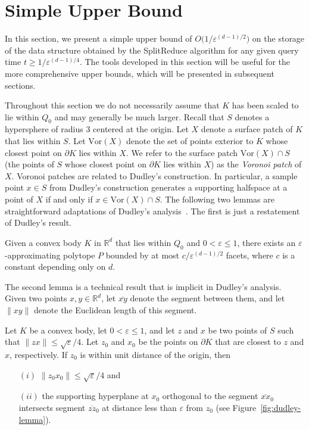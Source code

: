 \documentclass[11pt]{article}   \usepackage[letterpaper,hmargin=2.1cm,vmargin=3cm]{geometry}
\newcommand{\RE}{\mathbb{R}}    \newcommand{\ZZ}{\mathbb{Z}}    \newcommand{\eps}{\varepsilon}  \newcommand{\ST}{\,:\,}         \newcommand{\sq}{\square}
\newcommand{\alg}{\textrm{SplitReduce}}
\newcommand{\Vor}{\mathrm{Vor}}
\begin{document}
\section{Simple Upper Bound} \label{sec:firstbound}


In this section, we present a simple upper bound of $O\big(1/\eps^{(d-1)/2}\big)$ on the storage of the data structure obtained by the {\alg} algorithm for any given query time $t \geq 1/\eps^{(d-1)/4}$. The tools developed in this section will be useful for the more comprehensive upper bounds, which will be presented in subsequent sections.

Throughout this section we do not necessarily assume that $K$ has been scaled to lie within $Q_0$ and may generally be much larger. Recall that $S$ denotes a hypersphere of radius $3$ centered at the origin. Let $X$ denote a surface patch of $K$ that lies within $S$. Let $\Vor(X)$ denote the set of points exterior to $K$ whose closest point on $\partial K$ lies within $X$. We refer to the surface patch $\Vor(X) \cap S$ (the points of $S$ whose closest point on $\partial K$ lies within $X$) as the \emph{Voronoi patch} of $X$. Voronoi patches are related to Dudley's construction. In particular, a sample point $x \in S$ from Dudley's construction generates a supporting halfspace at a point of $X$ if and only if $x \in \Vor(X) \cap S$. The following two lemmas are straightforward adaptations of Dudley's analysis~\cite{Dudley}. The first is just a restatement of Dudley's result.

\begin{lemma} \label{lem:Dudley1}
Given a convex body $K$ in $\RE^d$ that lies within $Q_0$ and $0 < \eps \le 1$, there exists an $\eps$-approximating polytope $P$ bounded by at most $c / \eps^{(d-1)/2}$ facets, where $c$ is a constant depending only on $d$.
\end{lemma}


The second lemma is a technical result that is implicit in Dudley's analysis. Given two points $x, y \in \RE^d$, let $\overline{x y}$ denote the segment between them, and let $\|x y\|$ denote the Euclidean length of this segment.

\begin{lemma} \label{lem:Dudley}
Let $K$ be a convex body, let $0 < \eps \le 1$, and let $z$ and $x$ be two points of $S$ such that $\|z x\| \le \sqrt{\eps} / 4$. Let $z_0$ and $x_0$ be the points on $\partial K$ that are closest to $z$ and $x$, respectively. If $z_0$ is within unit distance of the origin, then
\begin{enumerate}
\item[$(i)$] $\|z_0 x_0\| \leq \sqrt{\eps} / 4$ and

\item[$(ii)$] the supporting hyperplane at $x_0$ orthogonal to the segment $\overline{x x}_0$ intersects segment $\overline{z z}_0$ at distance less than $\eps$ from $z_0$ (see Figure~\ref{fig:dudley-lemma}).
\end{enumerate}
\end{lemma}
\end{document}
